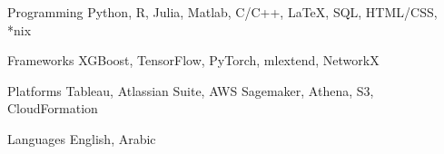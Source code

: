 


\begin{cvskills}
	

\cvskill
{Programming} %
{Python, R,  Julia, Matlab, C/C++, \LaTeX , SQL, HTML/CSS, *nix} %

\cvskill
{Frameworks} %
{XGBoost, TensorFlow, PyTorch, mlextend, NetworkX} %

\cvskill
{Platforms} %
{Tableau, Atlassian Suite, AWS Sagemaker, Athena, S3, CloudFormation} %

\cvskill
{Languages} %
{English, Arabic} %

\end{cvskills}
